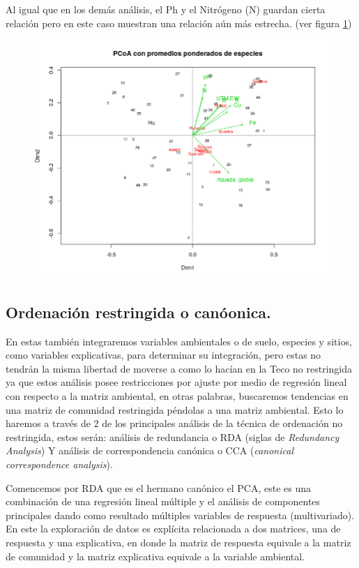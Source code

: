 \documentclass[11pt,]{article}
\begin{document}
Al igual que en los demás análisis, el Ph y el Nitrógeno (N) guardan
cierta relación pero en este caso muestran una relación aún más
estrecha. (ver figura \ref{fig:PCoA})

\begin{figure}
\centering
\includegraphics{PCoA.png}
\caption{\label{fig:PCoA}}
\end{figure}

\subsection{Ordenación restringida o
canóonica.}\label{ordenaciuxf3n-restringida-o-canuxf3onica.}

En estas también integraremos variables ambientales o de suelo, especies
y sitios, como variables explicativas, para determinar su integración,
pero estas no tendrán la misma libertad de moverse a como lo hacían en
la Teco no restringida ya que estos análisis posee restricciones por
ajuste por medio de regresión lineal con respecto a la matriz ambiental,
en otras palabras, buscaremos tendencias en una matriz de comunidad
restringida péndolas a una matriz ambiental. Esto lo haremos a través de
2 de los principales análisis de la técnica de ordenación no
restringida, estos serán: análisis de redundancia o RDA (siglas de
\emph{Redundancy Analysis}) Y análisis de correspondencia canónica o CCA
(\emph{canonical correspondence analysis}).

Comencemos por RDA que es el hermano canónico el PCA, este es una
combinación de una regresión lineal múltiple y el análisis de
componentes principales dando como resultado múltiples variables de
respuesta (multivariado). En este la exploración de datos es explícita
relacionada a dos matrices, una de respuesta y una explicativa, en donde
la matriz de respuesta equivale a la matriz de comunidad y la matriz
explicativa equivale a la variable ambiental.
\end{document}
